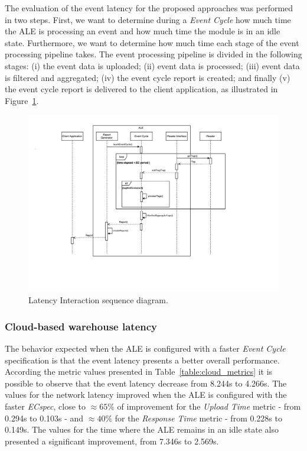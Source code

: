 The evaluation of the event latency for the proposed approaches was performed in two steps. First,
we want to determine during a \textit{Event Cycle} how much time the \gls{ALE} is processing an event
and how much time the module is in an idle state. Furthermore, we want to determine how much time
each stage of the event processing pipeline takes. The event processing pipeline is divided in the
following stages: (i) the event data is uploaded; (ii) event data is processed; (iii) event data is
filtered and aggregated; (iv) the event cycle report is created; and finally (v) the event cycle report
is delivered to the client application, as illustrated in Figure~\ref{fig:latency_seq_diagram}.

\begin{figure}[ht!]
  \centering
  \includegraphics[width=\textwidth]{./images/latency_interaction_seq_diagram}
  \caption[Latency Interaction sequence diagram.]{Latency Interaction sequence diagram.}
  \label{fig:latency_seq_diagram}
\end{figure}

\subsubsection{Cloud-based warehouse latency}
\label{subs:eval_exp_latency_ecspec_fast}
The behavior expected when the \gls{ALE} is configured with a faster \textit{Event Cycle} specification
is that the event latency presents a better overall performance. According the metric values presented
in Table~\ref{table:cloud_metrics} it is possible to observe that the event latency decrease from 8.244s
to 4.266s. The values for the network latency improved when the \gls{ALE} is configured with the faster
\textit{ECspec}, close to $\approx65\%$ of improvement for the \textit{Upload Time} metric - from 0.294s
to 0.103s - and $\approx40\%$ for the \textit{Response Time} metric - from 0.228s to 0.149s. The
values for the time where the \gls{ALE} remains in an idle state also presented a significant
improvement, from 7.346s to 2.569s.

